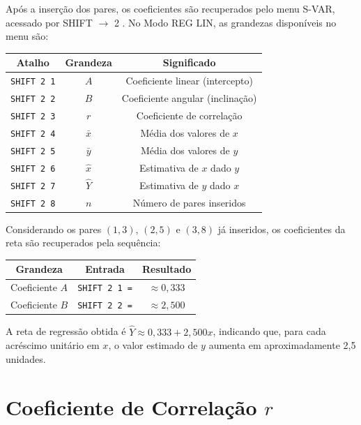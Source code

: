 Após a inserção dos pares, os coeficientes são recuperados pelo menu S-VAR, acessado por SHIFT $\to$ 2 \cite{casio2004}. No Modo REG LIN, as grandezas disponíveis no menu são:

\begin{table}[H]
    \centering
    \begin{tabular}{|c|c|c|}
        \hline
        \textbf{Atalho} & \textbf{Grandeza} & \textbf{Significado} \\ \hline
        \texttt{SHIFT 2 1} & $A$ & Coeficiente linear (intercepto) \\
        \texttt{SHIFT 2 2} & $B$ & Coeficiente angular (inclinação) \\
        \texttt{SHIFT 2 3} & $r$ & Coeficiente de correlação \\
        \texttt{SHIFT 2 4} & $\bar{x}$ & Média dos valores de $x$ \\
        \texttt{SHIFT 2 5} & $\bar{y}$ & Média dos valores de $y$ \\
        \texttt{SHIFT 2 6} & $\hat{x}$ & Estimativa de $x$ dado $y$ \\
        \texttt{SHIFT 2 7} & $\hat{Y}$ & Estimativa de $y$ dado $x$ \\
        \texttt{SHIFT 2 8} & $n$ & Número de pares inseridos \\ \hline
    \end{tabular}
\end{table}

Considerando os pares $(1, 3)$, $(2, 5)$ e $(3, 8)$ já inseridos, os coeficientes da reta são recuperados pela sequência:

\begin{table}[H]
    \centering
    \begin{tabular}{|c|c|c|}
        \hline
        \textbf{Grandeza} & \textbf{Entrada} & \textbf{Resultado} \\ \hline
        Coeficiente $A$ & \texttt{SHIFT 2 1 =} & $\approx 0{,}333$ \\
        Coeficiente $B$ & \texttt{SHIFT 2 2 =} & $\approx 2{,}500$ \\ \hline
    \end{tabular}
\end{table}

A reta de regressão obtida é $\hat{Y} \approx 0{,}333 + 2{,}500x$, indicando que, para cada acréscimo unitário em $x$, o valor estimado de $y$ aumenta em aproximadamente 2,5 unidades.

\section{Coeficiente de Correlação \texorpdfstring{$r$}{r}}


